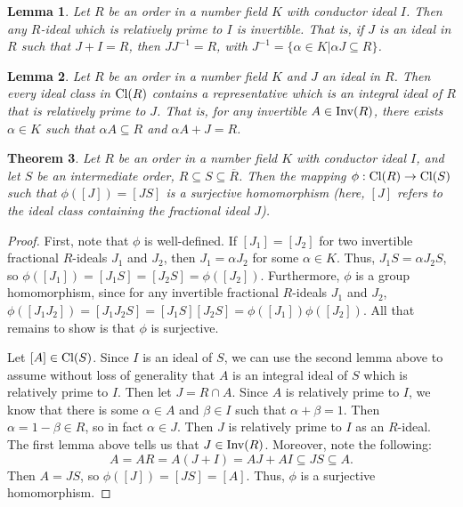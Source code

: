 \documentclass[12pt]{amsart}
\newtheorem{theorem}{Theorem}[section]
\newtheorem{lemma}[theorem]{Lemma}
\theoremstyle{definition}
\newcommand{\Rbar}{\overline{R}}
\newcommand{\Inv}{\textup{Inv}}
\newcommand{\Cl}{\textup{Cl}}
\begin{document}
	\begin{lemma}
		\label{rel prime means invertible}
		Let $R$ be an order in a number field $K$ with conductor ideal $I$. Then any $R$-ideal which is relatively prime to $I$ is invertible. That is, if $J$ is an ideal in $R$ such that $J+I=R$, then $JJ^{-1}=R$, with $J^{-1}=\{\alpha\in K|\alpha J\subseteq R\}$.
	\end{lemma}
	
	\begin{lemma}
		\label{int ideal rel prime}
		Let $R$ be an order in a number field $K$ and $J$ an ideal in $R$. Then every ideal class in $\Cl(R)$ contains a representative which is an integral ideal of $R$ that is relatively prime to $J$. That is, for any invertible $A\in \Inv(R)$, there exists $\alpha\in K$ such that $\alpha A\subseteq R$ and $\alpha A+J=R$.
	\end{lemma}
	
	\begin{theorem}
		\label{surjective class map}
		Let $R$ be an order in a number field $K$ with conductor ideal $I$, and let $S$ be an intermediate order, $R\subseteq S\subseteq\Rbar$. Then the mapping $\phi:\Cl(R)\to\Cl(S)$ such that $\phi([J])=[JS]$ is a surjective homomorphism (here, $[J]$ refers to the ideal class containing the fractional ideal $J$).
	\end{theorem}
	
	\begin{proof}
		First, note that $\phi$ is well-defined. If $[J_1]=[J_2]$ for two invertible fractional $R$-ideals $J_1$ and $J_2$, then $J_1=\alpha J_2$ for some $\alpha\in K$. Thus, $J_1S=\alpha J_2S$, so $\phi([J_1])=[J_1S]=[J_2S]=\phi([J_2])$. Furthermore, $\phi$ is a group homomorphism, since for any invertible fractional $R$-ideals $J_1$ and $J_2$, $\phi([J_1J_2])=[J_1J_2S]=[J_1S][J_2S]=\phi([J_1])\phi([J_2])$. All that remains to show is that $\phi$ is surjective.
		
		Let $[A]\in\Cl(S)$. Since $I$ is an ideal of $S$, we can use the second lemma above to assume without loss of generality that $A$ is an integral ideal of $S$ which is relatively prime to $I$. Then let $J=R\cap A$. Since $A$ is relatively prime to $I$, we know that there is some $\alpha\in A$ and $\beta\in I$ such that $\alpha+\beta=1$. Then $\alpha=1-\beta\in R$, so in fact $\alpha\in J$. Then $J$ is relatively prime to $I$ as an $R$-ideal. The first lemma above tells us that $J\in \Inv(R)$. Moreover, note the following:
		$$A=AR=A(J+I)=AJ+AI\subseteq JS\subseteq A.$$
		Then $A=JS$, so $\phi([J])=[JS]=[A]$. Thus, $\phi$ is a surjective homomorphism.
	\end{proof}
	
\end{document}
